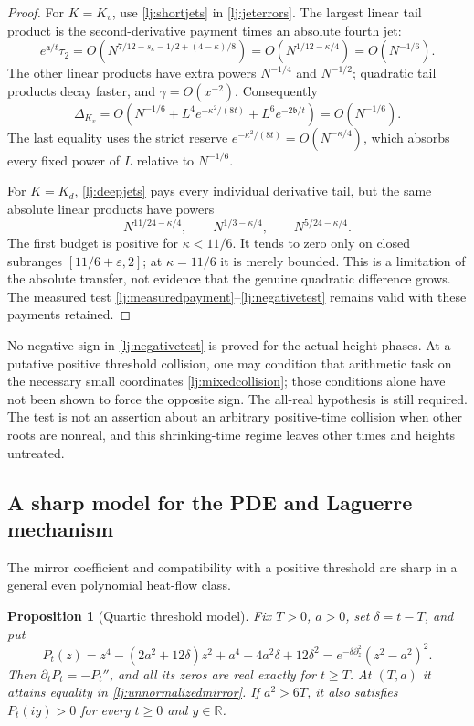 \documentclass[11pt]{article}
\numberwithin{equation}{section}
\newtheorem{proposition}[theorem]{Proposition}
\theoremstyle{definition}
\theoremstyle{remark}
\begin{document}
\begin{proof}
For \(K=K_v\), use \eqref{lj:shortjets} in \eqref{lj:jeterrors}.
The largest linear tail product is the second-derivative payment times
an absolute fourth jet:
\[
 e^{\mathfrak a/t}\tau_2
 =O\left(N^{7/12-s_\kappa-1/2+(4-\kappa)/8}\right)
 =O(N^{1/12-\kappa/4})=O(N^{-1/6}).
\]
The other linear products have extra powers \(N^{-1/4}\) and
\(N^{-1/2}\); quadratic tail products decay faster, and
\(\gamma=O(x^{-2})\). Consequently
\begin{equation}\label{lj:corequadraticpayment}
 \Delta_{K_v}
 =O\left(N^{-1/6}+L^4e^{-\kappa^2/(8t)}
                         +L^6e^{-2\mathfrak b/t}\right)
 =O(N^{-1/6}).
\end{equation}
The last equality uses the strict reserve
\(e^{-\kappa^2/(8t)}=O(N^{-\kappa/4})\), which absorbs every
fixed power of \(L\) relative to \(N^{-1/6}\).

For \(K=K_d\), \eqref{lj:deepjets} pays every individual derivative
tail, but the same absolute linear products have powers
\[
 N^{11/24-\kappa/4},\qquad
 N^{1/3-\kappa/4},\qquad N^{5/24-\kappa/4}.
\]
The first budget is positive for \(\kappa<11/6\).
It tends to zero only on closed subranges
\([11/6+\varepsilon,2]\); at \(\kappa=11/6\) it is merely bounded.
This is a limitation of the absolute transfer, not evidence that the
genuine quadratic difference grows. The measured test
\eqref{lj:measuredpayment}--\eqref{lj:negativetest} remains valid
with these payments retained.
\end{proof}

No negative sign in \eqref{lj:negativetest} is proved for the actual
height phases. At a putative positive threshold collision, one may
condition that arithmetic task on the necessary small coordinates
\eqref{lj:mixedcollision}; those conditions alone have not been shown
to force the opposite sign. The all-real hypothesis is still required.
The test is not an assertion about an arbitrary positive-time collision
when other roots are nonreal, and this shrinking-time regime leaves
other times and heights untreated.

\subsection{A sharp model for the PDE and Laguerre mechanism}

The mirror coefficient and compatibility with a positive threshold are
sharp in a general even polynomial heat-flow class.

\begin{proposition}[Quartic threshold model]\label{lj:quartic}
Fix \(T>0\), \(a>0\), set \(\delta=t-T\), and put
\begin{equation}\label{lj:quarticflow}
 P_t(z)=z^4-(2a^2+12\delta)z^2
          +a^4+4a^2\delta+12\delta^2
       =e^{-\delta\partial_z^2}(z^2-a^2)^2.
\end{equation}
Then \(\partial_tP_t=-P_t''\), and all its zeros are real exactly
for \(t\ge T\). At \((T,a)\) it attains equality in
\eqref{lj:unnormalizedmirror}. If \(a^2>6T\), it also satisfies
\(P_t(iy)>0\) for every \(t\ge0\) and \(y\in\mathbb R\).
\end{proposition}
\end{document}

